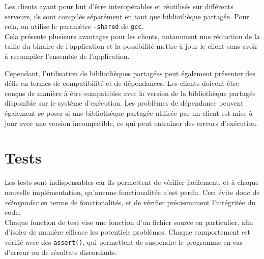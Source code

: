 

Les clients ayant pour but d'être interopérables et réutilisés sur différents serveurs, ils sont compilés séparément en tant que bibliothèque partagée. Pour cela, on utilise le paramètre \texttt{-shared} de \texttt{gcc}.\\
Cela présente plusieurs avantages pour les clients, notamment une réduction de la taille du binaire de l'application et la possibilité mettre à jour le client sans avoir à recompiler l'ensemble de l'application.

\medbreak

Cependant, l'utilisation de bibliothèques partagées peut également présenter des défis en termes de compatibilité et de dépendances. Les clients doivent être conçus de manière à être compatibles avec la version de la bibliothèque partagée disponible sur le système d'exécution. Les problèmes de dépendance peuvent également se poser si une bibliothèque partagée utilisée par un client est mise à jour avec une version incompatible, ce qui peut entraîner des erreurs d'exécution.

\section{Tests}

Les tests sont indispensables car ils permettent de vérifier facilement, et à chaque nouvelle implémentation, qu'aucune fonctionalitée n'est perdu. Ceci évite donc de \textit{rétrograder} en terme de fonctionalités, et de vérifier précisemment l'intégritée du code. \\
Chaque fonction de test vise une fonction d'un fichier source en particulier, afin d'isoler de manière efficace les potentiels problèmes. Chaque comportement est vérifié avec des \texttt{assert()}, qui permettent de suspendre le programme en cas d'erreur ou de résultats discordants. 